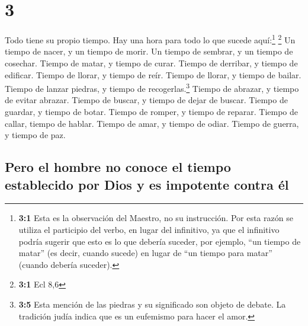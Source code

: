 \hypertarget{section-2}{%
\section{3}\label{section-2}}

 Todo tiene su propio tiempo. Hay una hora para todo lo
que sucede aquí:\footnote{\textbf{3:1} Esta es la observación del
  Maestro, no su instrucción. Por esta razón se utiliza el participio
  del verbo, en lugar del infinitivo, ya que el infinitivo podría
  sugerir que esto es lo que debería suceder, por ejemplo, ``un tiempo
  de matar'' (es decir, cuando sucede) en lugar de ``un tiempo para
  matar'' (cuando debería suceder).} \footnote{\textbf{3:1} Ecl 8,6}
 Un tiempo de nacer, y un tiempo de morir. Un tiempo de
sembrar, y un tiempo de cosechar.  Tiempo de matar, y
tiempo de curar. Tiempo de derribar, y tiempo de edificar.
 Tiempo de llorar, y tiempo de reír. Tiempo de llorar, y
tiempo de bailar.  Tiempo de lanzar piedras, y tiempo de
recogerlas.\footnote{\textbf{3:5} Esta mención de las piedras y su
  significado son objeto de debate. La tradición judía indica que es un
  eufemismo para hacer el amor.} Tiempo de abrazar, y tiempo de evitar
abrazar.  Tiempo de buscar, y tiempo de dejar de buscar.
Tiempo de guardar, y tiempo de botar.  Tiempo de romper, y
tiempo de reparar. Tiempo de callar, tiempo de hablar. 
Tiempo de amar, y tiempo de odiar. Tiempo de guerra, y tiempo de paz.

\hypertarget{pero-el-hombre-no-conoce-el-tiempo-establecido-por-dios-y-es-impotente-contra-uxe9l}{%
\subsection{Pero el hombre no conoce el tiempo establecido por Dios y es
impotente contra
él}\label{pero-el-hombre-no-conoce-el-tiempo-establecido-por-dios-y-es-impotente-contra-uxe9l}}

